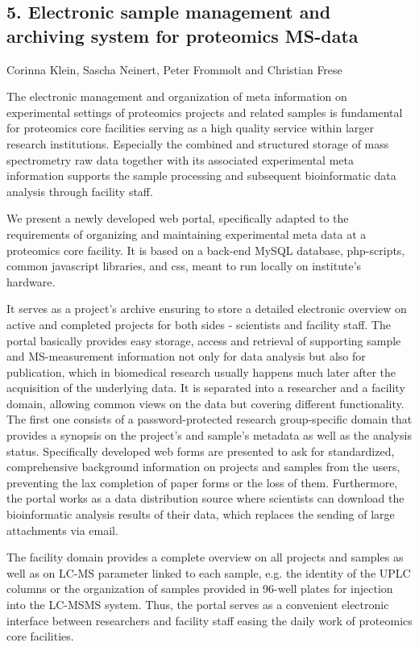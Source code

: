 \subsection*{\color{eubicRed} 5. Electronic sample management and archiving system for proteomics MS-data}
{\color{eubicGray}Corinna Klein, Sascha Neinert, Peter Frommolt and Christian Frese}

The electronic management and organization of meta information on experimental settings of proteomics projects and related samples is fundamental for proteomics core facilities serving as a high quality service within larger research institutions. Especially the combined and structured storage of mass spectrometry raw data together with its associated experimental meta information supports the sample processing and subsequent bioinformatic data analysis through facility staff.

We present a newly developed web portal, specifically adapted to the requirements of organizing and maintaining experimental meta data at a proteomics core facility. It is based on a back-end MySQL database, php-scripts, common javascript libraries, and css, meant to run locally on institute's hardware.

It serves as a project's archive ensuring to store a detailed electronic overview on active and completed projects for both sides - scientists and facility staff. The portal basically provides easy storage, access and retrieval of supporting sample and MS-measurement information not only for data analysis but also for publication, which in biomedical research usually happens much later after the acquisition of the underlying data. It is separated into a researcher and a facility domain, allowing common views on the data but covering different functionality. The first one consists of a password-protected research group-specific domain that provides a synopsis on the project's and sample's metadata as well as the analysis status. Specifically developed web forms are presented to ask for standardized, comprehensive background information on projects and samples from the users, preventing the lax completion of paper forms or the loss of them. Furthermore, the portal works as a data distribution source where scientists can download the bioinformatic analysis results of their data, which replaces the sending of large attachments via email.

The facility domain provides a complete overview on all projects and samples as well as on LC-MS parameter linked to each sample, e.g. the identity of the UPLC columns or the organization of samples provided in 96-well plates for injection into the LC-MSMS system.
Thus, the portal serves as a convenient electronic interface between researchers and facility staff easing the daily work of proteomics core facilities.

